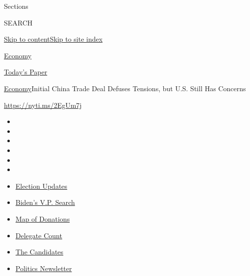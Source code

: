 Sections

SEARCH

\protect\hyperlink{site-content}{Skip to
content}\protect\hyperlink{site-index}{Skip to site index}

\href{https://www.nytimes.com/section/business/economy}{Economy}

\href{https://myaccount.nytimes.com/auth/login?response_type=cookie\&client_id=vi}{}

\href{https://www.nytimes.com/section/todayspaper}{Today's Paper}

\href{/section/business/economy}{Economy}\textbar{}Initial China Trade
Deal Defuses Tensions, but U.S. Still Has Concerns

\url{https://nyti.ms/2EgUm7j}

\begin{itemize}
\item
\item
\item
\item
\item
\item
\end{itemize}

\begin{itemize}
\item
  \href{https://www.nytimes.com/2020/08/03/us/elections/biden-vs-trump.html?action=click\&pgtype=Article\&state=default\&region=TOP_BANNER\&context=storylines_menu}{Election
  Updates}
\item
  \href{https://www.nytimes.com/article/biden-vice-president-2020.html?action=click\&pgtype=Article\&state=default\&region=TOP_BANNER\&context=storylines_menu}{Biden's
  V.P. Search}
\item
  \href{https://www.nytimes.com/interactive/2020/07/24/us/politics/trump-biden-campaign-donors.html?action=click\&pgtype=Article\&state=default\&region=TOP_BANNER\&context=storylines_menu}{Map
  of Donations}
\item
  \href{https://www.nytimes.com/interactive/2020/us/elections/delegate-count-primary-results.html?action=click\&pgtype=Article\&state=default\&region=TOP_BANNER\&context=storylines_menu}{Delegate
  Count}
\item
  \href{https://www.nytimes.com/interactive/2019/us/politics/2020-presidential-candidates.html?action=click\&pgtype=Article\&state=default\&region=TOP_BANNER\&context=storylines_menu}{The
  Candidates}
\item
  \href{https://www.nytimes.com/newsletters/politics?action=click\&pgtype=Article\&state=default\&region=TOP_BANNER\&context=storylines_menu}{Politics
  Newsletter}
\end{itemize}

